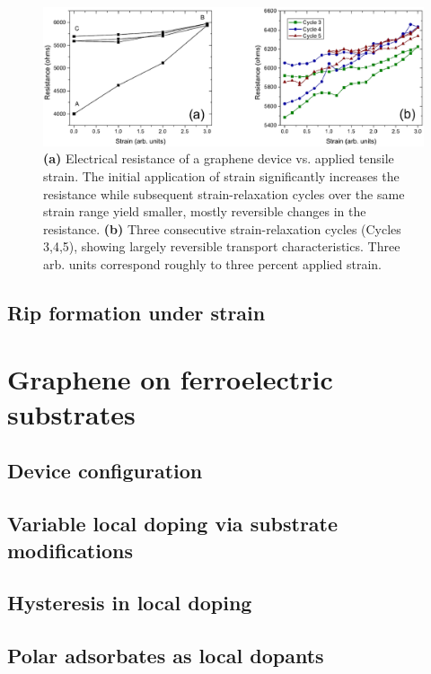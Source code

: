 \documentclass[edeposit,fullpage,draftthesis]{uiucthesis2009}
\begin{document}
    \begin{figure}
    \includegraphics[width=\linewidth]{images/resultsanddiscussion/rippingpaper-RvsStrain.eps}
    \caption[Resistance vs Strain for graphene on flexible substrates]{\textbf{(a)} Electrical resistance of a graphene device vs. applied tensile strain. The initial application of strain significantly increases the resistance while subsequent strain-relaxation cycles over the same strain range yield smaller, mostly reversible changes in the resistance. \textbf{(b)} Three consecutive strain-relaxation cycles (Cycles 3,4,5), showing largely reversible transport characteristics. Three arb. units correspond roughly to three percent applied strain.}
    \label{fig:rippingpaper-RvsStrain}
    \end{figure}

    \subsection{Rip formation under strain}

\section{Graphene on ferroelectric substrates}
    \subsection{Device configuration}
    \subsection{Variable local doping via substrate modifications}
    \subsection{Hysteresis in local doping}
    \subsection{Polar adsorbates as local dopants}
\end{document}
